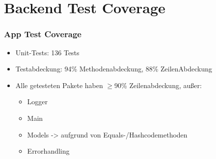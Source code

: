 \section*{Backend Test Coverage}

\begin{frame}\frametitle{App Test Coverage}
    \begin{itemize}
        \item Unit-Tests: 136 Tests
        \item Testabdeckung: 94\% Methodenabdeckung, 88\% ZeilenAbdeckung
        \item Alle getesteten Pakete haben $\geq$90\% Zeilenabdeckung, außer: 
        \begin{itemize}
            \item Logger
            \item Main
            \item Models -> aufgrund von Equals-/Hashcodemethoden 
            \item Errorhandling
        \end{itemize}
    \end{itemize}
\end{frame}